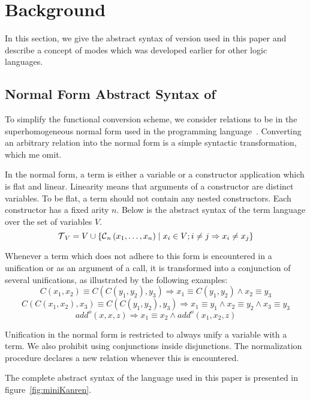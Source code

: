 \section{Background}

In this section, we give the abstract syntax of \micro version used in this paper and describe a concept of modes which was developed earlier for other logic languages.

\subsection{Normal Form Abstract Syntax of \micro}

To simplify the functional conversion scheme, we consider \micro relations to be in the superhomogeneous normal form used in the \merc programming language~\cite{somogyi1996execution}. 
Converting an arbitrary \micro relation into the normal form is a simple syntactic transformation, which me omit.

In the normal form, a term is either a variable or a constructor application which is flat and linear.
Linearity means that arguments of a constructor are distinct variables.
To be flat, a term should not contain any nested constructors.
Each constructor has a fixed arity $n$.
Below is the abstract syntax of the term language over the set of variables $V$.
\[  \operatorname{\mathcal{T}}_{V} = V \cup \{\operatorname{\mathcal{C}}_{n}\left( x_1, \ldots, x_{n} \right) \mid x_{i}\in V; i \neq j \Rightarrow x_i \neq x_j\} \]

Whenever a term which does not adhere to this form is encountered in a unification or as an argument of a call, it is transformed into a conjunction of several unifications, as illustrated by the following examples:
\[ C\left( x_1, x_2 \right) \equiv C\left( C\left( y_1, y_2 \right), y_3 \right) \Rightarrow x_1 \equiv C\left( y_1, y_2 \right) \land x_2 \equiv y_3   \]
\[ C\left( C\left( x_1, x_2 \right), x_3 \right) \equiv C\left( C\left( y_1, y_2 \right), y_3 \right) \Rightarrow x_1 \equiv y_1 \land x_2 \equiv y_2 \land x_3 \equiv y_3   \]
\[add^o\left( x, x, z \right) \Rightarrow x_1 \equiv x_2 \land add^o\left( x_1, x_2, z \right) \]

Unification in the normal form is restricted to always unify a variable with a term.
We also prohibit using conjunctions inside disjunctions.
The normalization procedure declares a new relation whenever this is encountered.

The complete abstract syntax of the \micro language used in this paper is presented in figure~\ref{fig:miniKanren}.

